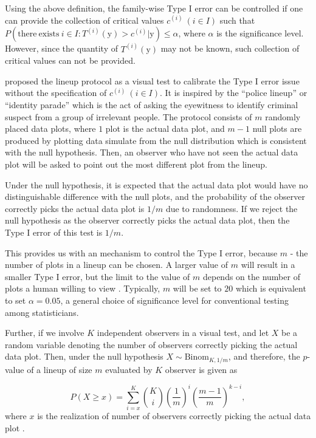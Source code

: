 \documentclass{monashthesis}
\begin{document}
Using the above definition, the family-wise Type I error can be controlled if one can provide the collection of critical values \(c^{(i)}~(i \in I)\) such that \(P(\mathrm{there~exists~} i \in I: T^{(i)}(\boldsymbol{\mathrm{y}}) > c^{(i)}|\boldsymbol{\mathrm{y}}) \leq \alpha\), where \(\alpha\) is the significance level. However, since the quantity of \(T^{(i)}(\boldsymbol{\mathrm{y}})\) may not be known, such collection of critical values can not be provided.

\textcite{buja_statistical_2009} proposed the lineup protocol as a visual test to calibrate the Type I error issue without the specification of \(c^{(i)}~(i \in I)\). It is inspired by the ``police lineup'' or ``identity parade'' which is the act of asking the eyewitness to identify criminal suspect from a group of irrelevant people. The protocol consists of \(m\) randomly placed data plots, where \(1\) plot is the actual data plot, and \(m-1\) null plots are produced by plotting data simulate from the null distribution which is consistent with the null hypothesis. Then, an observer who have not seen the actual data plot will be asked to point out the most different plot from the lineup.

Under the null hypothesis, it is expected that the actual data plot would have no distinguishable difference with the null plots, and the probability of the observer correctly picks the actual data plot is \(1/m\) due to randomness. If we reject the null hypothesis as the observer correctly picks the actual data plot, then the Type I error of this test is \(1/m\).

This provides us with an mechanism to control the Type I error, because \(m\) - the number of plots in a lineup can be chosen. A larger value of \(m\) will result in a smaller Type I error, but the limit to the value of \(m\) depends on the number of plots a human willing to view \autocite{buja_statistical_2009}. Typically, \(m\) will be set to \(20\) which is equivalent to set \(\alpha = 0.05\), a general choice of significance level for conventional testing among statisticians.

Further, if we involve \(K\) independent observers in a visual test, and let \(X\) be a random variable denoting the number of observers correctly picking the actual data plot. Then, under the null hypothesis \(X \sim \mathrm{Binom}_{K,1/m}\), and therefore, the \(p\)-value of a lineup of size \(m\) evaluated by \(K\) observer is given as

\[P(X \geq x) = \sum_{i=x}^{K}{{K}\choose{i}}\left(\frac{1}{m}\right)^i\left(\frac{m-1}{m}\right)^{k-i},\]
where \(x\) is the realization of number of observers correctly picking the actual data plot \autocite{majumder_validation_2013}.
\end{document}
